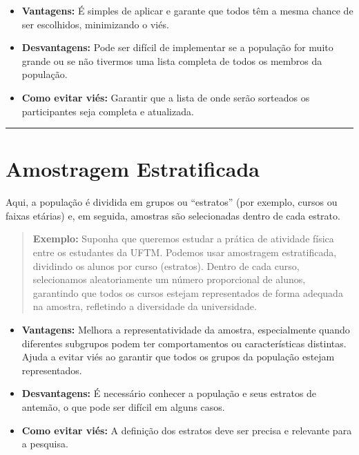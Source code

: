 \documentclass[
]{book}
\providecommand{\tightlist}{%
  \setlength{\itemsep}{0pt}\setlength{\parskip}{0pt}}
\begin{document}
\begin{itemize}
\tightlist
\item
  \textbf{Vantagens:} É simples de aplicar e garante que todos têm a mesma chance de ser escolhidos, minimizando o viés.
\item
  \textbf{Desvantagens:} Pode ser difícil de implementar se a população for muito grande ou se não tivermos uma lista completa de todos os membros da população.
\item
  \textbf{Como evitar viés:} Garantir que a lista de onde serão sorteados os participantes seja completa e atualizada.
\end{itemize}

\begin{center}\rule{0.5\linewidth}{0.5pt}\end{center}

\section{Amostragem Estratificada}\label{amostragem-estratificada}

Aqui, a população é dividida em grupos ou ``estratos'' (por exemplo, cursos ou faixas etárias) e, em seguida, amostras são selecionadas dentro de cada estrato.

\begin{quote}
\textbf{Exemplo:} Suponha que queremos estudar a prática de atividade física entre os estudantes da UFTM. Podemos usar amostragem estratificada, dividindo os alunos por curso (estratos). Dentro de cada curso, selecionamos aleatoriamente um número proporcional de alunos, garantindo que todos os cursos estejam representados de forma adequada na amostra, refletindo a diversidade da universidade.
\end{quote}

\begin{itemize}
\tightlist
\item
  \textbf{Vantagens:} Melhora a representatividade da amostra, especialmente quando diferentes subgrupos podem ter comportamentos ou características distintas. Ajuda a evitar viés ao garantir que todos os grupos da população estejam representados.
\item
  \textbf{Desvantagens:} É necessário conhecer a população e seus estratos de antemão, o que pode ser difícil em alguns casos.
\item
  \textbf{Como evitar viés:} A definição dos estratos deve ser precisa e relevante para a pesquisa.
\end{itemize}
\end{document}
